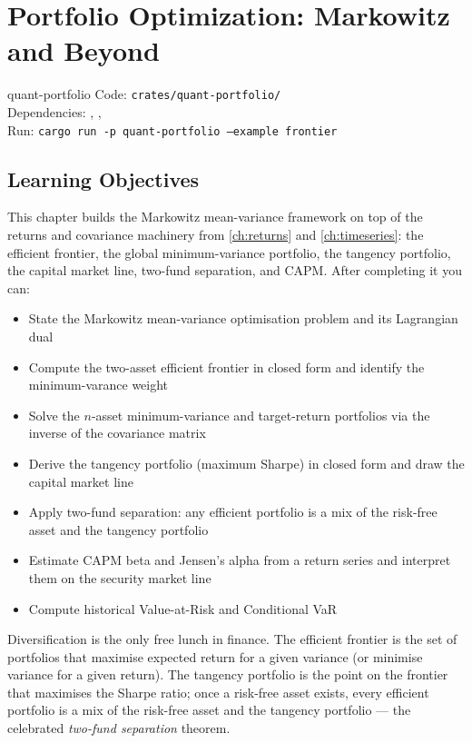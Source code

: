 \chapter{Portfolio Optimization: Markowitz and Beyond}
\label{ch:portfolio}

\begin{companioncode}{quant-portfolio}
Code: \texttt{crates/quant-portfolio/}\\
Dependencies: , , \\
Run: \texttt{cargo run -p quant-portfolio --example frontier}
\end{companioncode}

\section{Learning Objectives}

This chapter builds the Markowitz mean-variance framework on top of the
returns and covariance machinery from \cref{ch:returns} and \cref{ch:timeseries}:
the efficient frontier, the global minimum-variance portfolio, the tangency
portfolio, the capital market line, two-fund separation, and CAPM. After
completing it you can:

\begin{itemize}
    \item State the Markowitz mean-variance optimisation problem and its
      Lagrangian dual
    \item Compute the two-asset efficient frontier in closed form and
      identify the minimum-varance weight
    \item Solve the $n$-asset minimum-variance and target-return portfolios
      via the inverse of the covariance matrix
    \item Derive the tangency portfolio (maximum Sharpe) in closed form and
      draw the capital market line
    \item Apply two-fund separation: any efficient portfolio is a mix of the
      risk-free asset and the tangency portfolio
    \item Estimate CAPM beta and Jensen's alpha from a return series and
      interpret them on the security market line
    \item Compute historical Value-at-Risk and Conditional VaR
\end{itemize}

\begin{keyinsight}
Diversification is the only free lunch in finance. The efficient frontier
is the set of portfolios that maximise expected return for a given variance
(or minimise variance for a given return). The tangency portfolio is the
point on the frontier that maximises the Sharpe ratio; once a risk-free
asset exists, every efficient portfolio is a mix of the risk-free asset
and the tangency portfolio --- the celebrated \emph{two-fund separation}
theorem.
\end{keyinsight}

